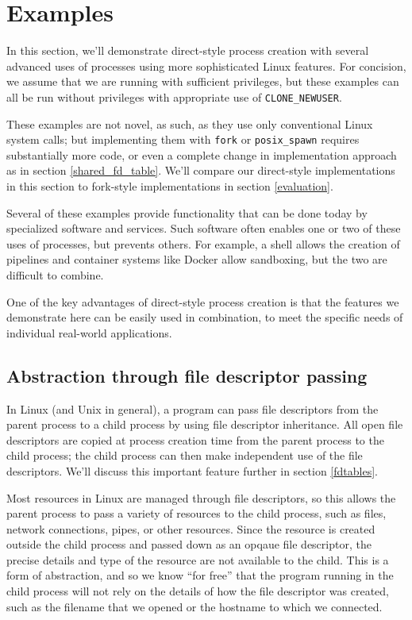 \documentclass[letterpaper,twocolumn,10pt]{article}
\begin{document}
\section{Examples}\label{examples}
In this section,
we'll demonstrate direct-style process creation
with several advanced uses of processes
using more sophisticated Linux features.
For concision, we assume that we are running with sufficient privileges,
but these examples can all be run without privileges with appropriate use of \verb|CLONE_NEWUSER|.
\cite{user_namespaces}\cite{unpriv_fuse}

These examples are not novel, as such, as they use only conventional Linux system calls;
but implementing them with \texttt{fork} or \verb|posix_spawn| requires substantially more code,
or even a complete change in implementation approach as in section \ref{shared_fd_table}.
We'll compare our direct-style implementations in this section
to fork-style implementations
in section \ref{evaluation}.

Several of these examples provide functionality that can be done today by specialized software and services.
Such software often enables one or two of these uses of processes, but prevents others.
For example, a shell allows the creation of pipelines and container systems like Docker allow sandboxing,
but the two are difficult to combine.\cite{docker_pipe}

One of the key advantages of direct-style process creation is that the features we demonstrate here
can be easily used in combination,
to meet the specific needs of individual real-world applications.
\subsection{Abstraction through file descriptor passing}\label{fd_abstraction}
In Linux (and Unix in general),
a program can pass file descriptors from the parent process to a child process
by using file descriptor inheritance.\cite{tlpi}
All open file descriptors are copied at process creation time from the parent process to the child process;
the child process can then make independent use of the file descriptors.
We'll discuss this important feature further in section \ref{fdtables}.

Most resources in Linux are managed through file descriptors,
so this allows the parent process to pass a variety of resources to the child process,
such as files, network connections, pipes, or other resources.\cite{ucspi}
Since the resource is created outside the child process and passed down as an opqaue file descriptor,
the precise details and type of the resource are not available to the child.
This is a form of abstraction,
and so we know ``for free''
that the program running in the child process
will not rely on the details of how the file descriptor was created,
such as the filename that we opened or the hostname to which we connected.\cite{theoremsforfree}
\end{document}
